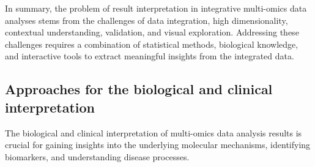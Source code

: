 \documentclass[a4paper, nobind]{templates/ociamthesis}
\begin{document}
In summary, the problem of result interpretation in integrative multi-omics data analyses stems from the challenges of data integration, high dimensionality, contextual understanding, validation, and visual exploration. Addressing these challenges requires a combination of statistical methods, biological knowledge, and interactive tools to extract meaningful insights from the integrated data.

\hypertarget{approaches-for-the-biological-and-clinical-interpretation}{%
\subsection{Approaches for the biological and clinical interpretation}\label{approaches-for-the-biological-and-clinical-interpretation}}

The biological and clinical interpretation of multi-omics data analysis results is crucial for gaining insights into the underlying molecular mechanisms, identifying biomarkers, and understanding disease processes.
\end{document}
